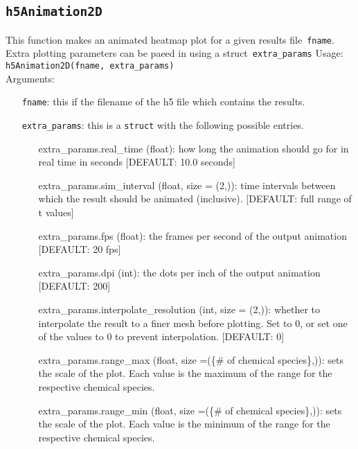 \documentclass[11pt]{article}
\begin{document}
    \subsection[\texttt{h5Animation2D}]{\texttt{h5Animation2D}}
    This function makes an animated heatmap plot for a given results file~\texttt{fname}.
    Extra plotting parameters can be paeed in using a struct~\texttt{extra\_params}
    Usage:\\
    \texttt{h5Animation2D(fname, extra\_params)}\\
    Arguments:
    \begin{itemize}
        \item[\texttt{fname}:] this if the filename of the h5 file which contains the results.
        \item[\texttt{extra\_params}:] this is a \texttt{struct} with the following possible entries.
        \begin{itemize}
            \item[extra\_params.real\_time] (float): how long the animation should go for in real time in seconds [DEFAULT: 10.0 seconds]
            \item[extra\_params.sim\_interval] (float, size = (2,)): time intervals between which the result should be animated (inclusive). [DEFAULT: full range of t values]
            \item[extra\_params.fps] (float): the frames per second of the output animation [DEFAULT: 20 fps]
            \item[extra\_params.dpi] (int): the dots per inch of the output animation [DEFAULT: 200]
            \item[extra\_params.interpolate\_resolution] (int, size = (2,)): whether to interpolate the result to a finer mesh before plotting. Set to 0, or set one of the values to 0 to prevent interpolation. [DEFAULT: 0]
            \item[extra\_params.range\_max] (float, size =(\{\# of chemical species\},)): sets the scale of the plot. Each value is the maximum of the range for the respective chemical species.
            \item[extra\_params.range\_min] (float, size =(\{\# of chemical species\},)): sets the scale of the plot. Each value is the minimum of the range for the respective chemical species.
        \end{itemize}
    \end{itemize}
\end{document}

